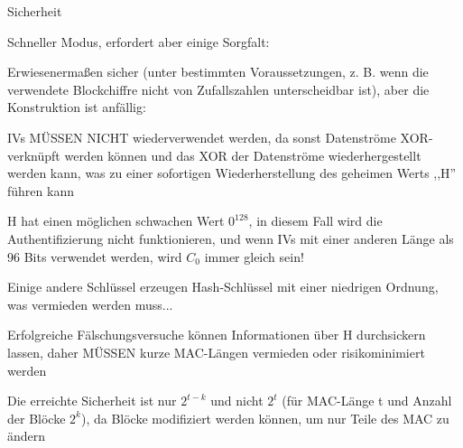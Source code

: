 \documentclass[a4paper]{article}
\begin{document}
\begin{multicols}{3}
\begin{itemize*}
\begin{itemize*}
            \end{itemize*}
            \item Sicherheit
            \begin{itemize*}
                  \item Schneller Modus, erfordert aber einige Sorgfalt:
                  \item Erwiesenermaßen sicher (unter bestimmten Voraussetzungen, z. B. wenn die verwendete Blockchiffre nicht von Zufallszahlen unterscheidbar ist), aber die Konstruktion ist anfällig:
                  \item IVs MÜSSEN NICHT wiederverwendet werden, da sonst Datenströme XOR-verknüpft werden können und das XOR der Datenströme wiederhergestellt werden kann, was zu einer sofortigen Wiederherstellung des geheimen Werts ,,H'' führen kann
                  \item H hat einen möglichen schwachen Wert $0^{128}$, in diesem Fall wird die Authentifizierung nicht funktionieren, und wenn IVs mit einer anderen Länge als 96 Bits verwendet werden, wird $C_0$ immer gleich sein!
                  \item Einige andere Schlüssel erzeugen Hash-Schlüssel mit einer niedrigen Ordnung, was vermieden werden muss...
                  \item Erfolgreiche Fälschungsversuche können Informationen über H durchsickern lassen, daher MÜSSEN kurze MAC-Längen vermieden oder risikominimiert werden
                  \item Die erreichte Sicherheit ist nur $2^{t-k}$ und nicht $2^t$ (für MAC-Länge t und Anzahl der Blöcke $2^k$), da Blöcke modifiziert werden können, um nur Teile des MAC zu ändern
            \end{itemize*}
      \end{itemize*}


\end{multicols}
\end{document}
